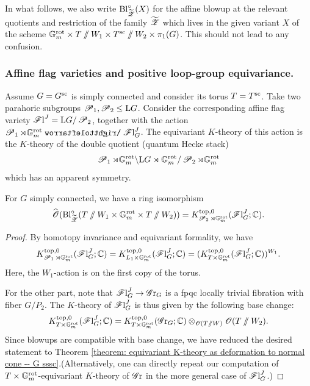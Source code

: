 In what follows, we also write $\Bl^{\circ}_{\widetilde{\eZ}}(X)$ for the affine blowup at the relevant quotients and restriction of the family $\widetilde{\eZ}$ which lives in the given variant $X$ of the scheme $\Gm^{\rot} \times T\sslash W_1 \times T^{\sc} \sslash W_2 \times \pi_1(G)$. This should not lead to any confusion.

\subsubsection{Affine flag varieties and positive loop-group equivariance.}
Assume $G = G^{\sc}$ is simply connected and consider its torus $T=T^{\sc}$. Take two parahoric subgroups $\eP_1, \eP_2 \leq \lo G$. Consider the corresponding affine flag variety $\Fl^J = \lo G / \eP_2$, together with the action
$\eP_1 \rtimes \Gm^{\rot} \acts  \Fl^J_G$. The equivariant $K$-theory of this action is the $K$-theory of the double quotient (quantum Hecke stack)
\begin{equation*}
    \eP_1 \rtimes \Gm^{\rot} \backslash \lo G \rtimes \Gm^{\rot} / \eP_2 \rtimes \Gm^{\rot}
\end{equation*}
which has an apparent symmetry. 

\begin{lemma}\label{lemma: equivariant K-theory as deformation to normal cone -- flag varieties and equivariance}
For $G$ simply connected, we have a ring isomorphism 
\begin{equation*}
    \widehat{\O}(\Bl^{\circ}_{\widetilde{\eZ}}(T\sslash W_1 \times \Gm^{\rot} \times T\sslash W_2))
    =K^{\top, 0}_{\eP_2 \rtimes \Gm^{\rot}}(\Fl^J_G; \C).
\end{equation*}   
\end{lemma}
\begin{proof}
By homotopy invariance and equivariant formality, we have
\begin{equation*}
K^{\top, 0}_{\eP_1 \rtimes \Gm^{\rot}}(\Fl^J_G; \C) = K^{\top, 0}_{L_1 \times \Gm^{\rot}}(\Fl^J_G; \C) = (K^{\top, 0}_{T \times \Gm^{\rot}}(\Fl^J_G; \C))^{W_1}.    
\end{equation*}
Here, the $W_1$-action is on the first copy of the torus. 

For the other part, note that $\Fl^J_G \to \Gr_G$ is a fpqc locally trivial fibration with fiber $G/P_{2}$. The $K$-theory of $\Fl^J_G$ is thus given by the following base change:
\begin{equation*}
    K^{\top, 0}_{T\times \Gm^{\rot}}(\Fl^J_G; \C) = K^{\top, 0}_{T\times \Gm^{\rot}}(\Gr_G; \C) \otimes_{\O(T \sslash W)} \O(T \sslash W_2).
\end{equation*}
Since blowups are compatible with base change, we have reduced the desired statement to Theorem \ref{theorem: equivariant K-theory as deformation to normal cone -- G sssc}.(Alternatively, one can directly repeat our computation of $T \times \Gm^{\rot}$-equivariant $K$-theory of $\Gr$ in the more general case of $\Fl^J_G$.)
\end{proof}


